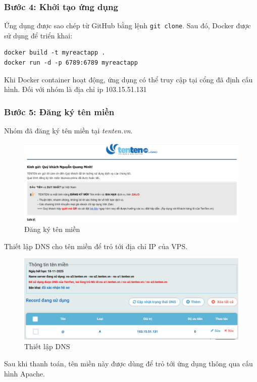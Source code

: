 \subsubsection{Bước 4: Khởi tạo ứng dụng}
Ứng dụng được sao chép từ GitHub bằng lệnh \texttt{git clone}. Sau đó, Docker được sử dụng để triển khai:
\begin{verbatim}
docker build -t myreactapp .
docker run -d -p 6789:6789 myreactapp
\end{verbatim}
Khi Docker container hoạt động, ứng dụng có thể truy cập tại cổng đã định cấu hình. Đối với nhóm là địa chỉ ip 103.15.51.131

\subsubsection{Bước 5: Đăng ký tên miền}
Nhóm đã đăng ký tên miền tại \textit{tenten.vn}. 
\begin{figure}[H]
    \centering
    \includegraphics[width=0.9\linewidth]{images/domain.png}
    \vspace{0.5cm}
    \caption{Đăng ký tên miền}
\end{figure}
Thiết lập DNS cho tên miền để trỏ tới địa chỉ IP của VPS.
\begin{figure}[H]
    \centering
    \includegraphics[width=0.9\linewidth]{images/dns.png}
    \vspace{0.5cm}
    \caption{Thiết lập DNS}
\end{figure}


Sau khi thanh toán, tên miền này được dùng để trỏ tới ứng dụng thông qua cấu hình Apache.

